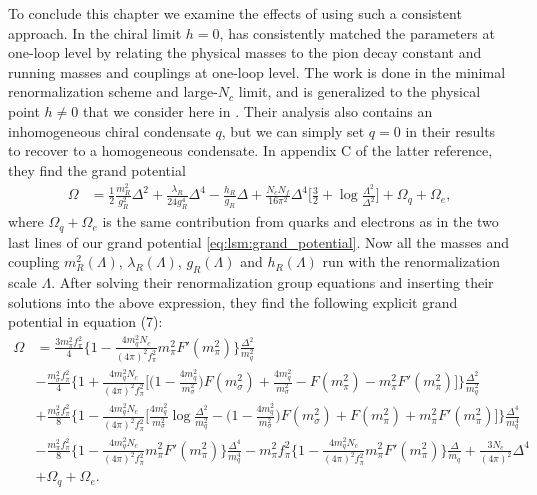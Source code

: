 To conclude this chapter we examine the effects of using such a consistent approach.
In the chiral limit $h=0$, \cite{ref:jo_lsm_consistent_chiral} has consistently matched the parameters at one-loop level by relating the physical masses to the pion decay constant and running masses and couplings at one-loop level.
The work is done in the minimal renormalization scheme and large-$N_c$ limit, and is generalized to the physical point $h \neq 0$ that we consider here in \cite{ref:jo_lsm_consistent_physical}.
Their analysis also contains an inhomogeneous chiral condensate $q$, but we can simply set $q=0$ in their results to recover to a homogeneous condensate.
In appendix C of the latter reference, they find the grand potential
\begin{equation}
\begin{split}
	\Omega &= \frac12 \frac{m_R^2}{g_R^2} \Delta^2 + \frac{\lambda_R}{24 g_R^4} \Delta^4 - \frac{h_R}{g_R} \Delta + \frac{N_c N_f}{16 \pi^2} \Delta^4 \bigg[ \frac32 + \log \frac{\Lambda^2}{\Delta^2} \bigg] + \Omega_q + \Omega_e,
\end{split}
\label{eq:lsm2f:grand_potential_consistent_before}
\end{equation}
where $\Omega_q+\Omega_e$ is the same contribution from quarks and electrons as in the two last lines of our grand potential \eqref{eq:lsm:grand_potential}.
Now all the masses and coupling $m_R^2(\Lambda)$, $\lambda_R(\Lambda)$, $g_R(\Lambda)$ and $h_R(\Lambda)$ run with the renormalization scale $\Lambda$.
After solving their renormalization group equations and inserting their solutions into the above expression, they find the following explicit grand potential in equation (7):
\begin{equation}
\begin{split}
	\Omega &= \frac{3 m_\pi^2 f_\pi^2}{4} \Bigg\{ 1 - \frac{4 m_q^2 N_c}{(4\pi)^2 f_\pi^2} m_\pi^2 F'(m_\pi^2) \Bigg\} \frac{\Delta^2}{m_q^2} \\
	       &- \frac{m_\sigma^2 f_\pi^2}{4} \Bigg\{ 1 + \frac{4 m_q^2 N_c}{(4\pi)^2 f_\pi^2} \Bigg[ \bigg(1 - \frac{4 m_q^2}{m_\sigma^2}\bigg) F(m_\sigma^2) + \frac{4 m_q^2}{m_\sigma^2} - F(m_\pi^2) - m_\pi^2 F'(m_\pi^2) \Bigg] \Bigg\} \frac{\Delta^2}{m_q^2} \\
	       &+ \frac{m_\sigma^2 f_\pi^2}{8} \Bigg\{ 1 - \frac{4 m_q^2 N_c}{(4 \pi)^2 f_\pi^2} \Bigg[ \frac{4 m_q^2}{m_\sigma^2} \log \frac{\Delta^2}{m_q^2} - \bigg(1 - \frac{4 m_q^2}{m_\sigma^2}\bigg) F(m_\sigma^2) + F(m_\pi^2) + m_\pi^2 F'(m_\pi^2) \Bigg] \Bigg\} \frac{\Delta^4}{m_q^4} \\
	       &- \frac{m_\pi^2 f_\pi^2}{8} \Bigg\{ 1 - \frac{4 m_q^2 N_c}{(4\pi)^2 f_\pi^2} m_\pi^2 F'(m_\pi^2) \Bigg\} \frac{\Delta^4}{m_q^4} - m_\pi^2 f_\pi^2 \Bigg\{ 1 - \frac{4 m_q^2 N_c}{(4\pi)^2 f_\pi^2} m_\pi^2 F'(m_\pi^2) \Bigg\} \frac{\Delta}{m_q} + \frac{3 N_c}{(4 \pi)^2} \Delta^4 \\
	       &+ \Omega_q + \Omega_e .
\end{split}
\label{eq:lsm2f:grand_potential_consistent}
\end{equation}
